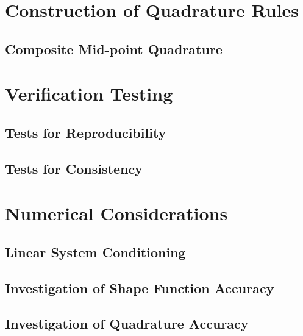 \section{Construction of Quadrature Rules}
	
	\subsection{Composite Mid-point Quadrature}

\section{Verification Testing}
	
	\subsection{Tests for Reproducibility}

	\subsection{Tests for Consistency}

\section{Numerical Considerations}

	\subsection{Linear System Conditioning}

	\subsection{Investigation of Shape Function Accuracy}

	\subsection{Investigation of Quadrature Accuracy}

